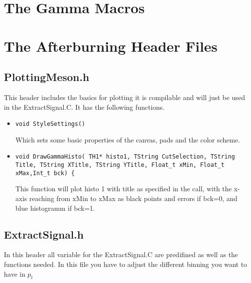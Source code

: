 	\section{The Gamma Macros}

	\section{The Afterburning Header Files}
	\subsection{PlottingMeson.h}
		This header includes the basics for plotting it is compilable and will just be used in the ExtractSignal.C. It has the following functions.
		\begin{itemize}
		 \item 	\begin{lstlisting}
void StyleSettings()
		       	\end{lstlisting}
			Which sets some basic properties of the canvas, pads and the color scheme.
		 \item \begin{lstlisting}
void DrawGammaHisto( TH1* histo1, TString CutSelection, TString Title, TString XTitle, TString YTitle, Float_t xMin, Float_t xMax,Int_t bck) {
		       \end{lstlisting}
			This function will plot histo 1 with title as specified in the call, with the x-axis reaching from xMin to xMax as black points and errors if bck=0, and blue histogramm if bck=1.
		\end{itemize}

	\subsection{ExtractSignal.h}
		In this header all variable for the ExtractSignal.C are predifined as well as the functions needed. In this file you have to adjust the different binning you want to have in $p_t$
	
